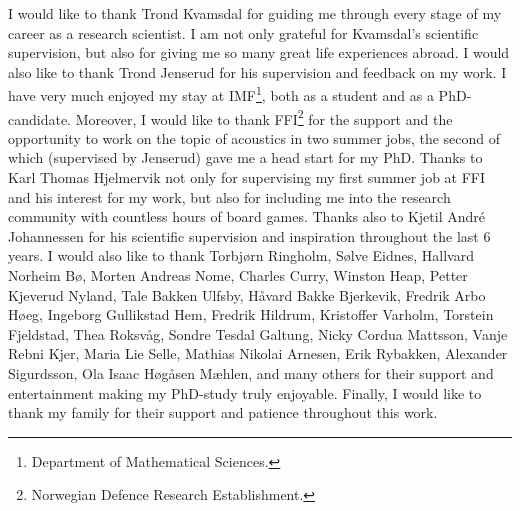 I would like to thank Trond Kvamsdal for guiding me through every stage of my career as a research scientist. I am not only grateful for Kvamsdal's scientific supervision, but also for giving me so many great life experiences abroad. 
I would also like to thank Trond Jenserud for his supervision and feedback on my work. I have very much enjoyed my stay at IMF\footnote{Department of Mathematical Sciences.}, both as a student and as a PhD-candidate. Moreover, I would like to thank FFI\footnote{Norwegian Defence Research Establishment.} for the support and the opportunity to work on the topic of acoustics in two summer jobs, the second of which (supervised by Jenserud) gave me a head start for my PhD. 
Thanks to Karl Thomas Hjelmervik not only for supervising my first summer job at FFI and his interest for my work, but also for including me into the research community with countless hours of board games. 
Thanks also to Kjetil Andr{\'{e}} Johannessen for his scientific supervision and inspiration throughout the last 6 years.
I would also like to thank Torbj{\o}rn Ringholm, S{\o}lve Eidnes, Hallvard Norheim B{\o}, Morten Andreas Nome, Charles Curry, Winston Heap, Petter Kjeverud Nyland, Tale Bakken Ulfsby, H{\aa}vard Bakke Bjerkevik, Fredrik Arbo H{\o}eg, Ingeborg Gullikstad Hem, Fredrik Hildrum, Kristoffer Varholm, Torstein Fjeldstad, Thea Roksv{\aa}g, Sondre Tesdal Galtung, Nicky Cordua Mattsson, Vanje Rebni Kjer, Maria Lie Selle, Mathias Nikolai Arnesen, Erik Rybakken, Alexander Sigurdsson, Ola Isaac H{\o}g{\aa}sen M{\ae}hlen, and many others for their support and entertainment making my PhD-study truly enjoyable.
Finally, I would like to thank my family for their support and patience throughout this work.